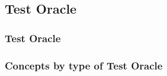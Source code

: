 
\subsection{Test Oracle}


\begin{frame}
\frametitle{Test Oracle}
  \begin{center}
  \end{center}
\end{frame}


\begin{frame}
\frametitle{Concepts by type of Test Oracle}
  \begin{center}
  \end{center}
\end{frame}